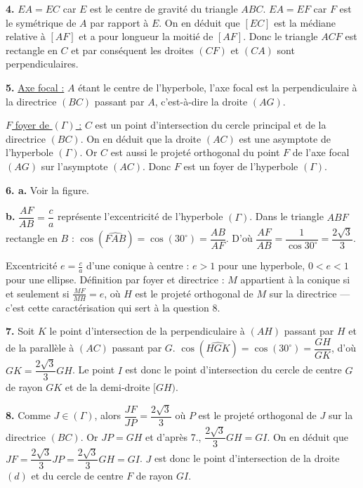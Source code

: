 \documentclass[11pt]{article}
\begin{document}
\textbf{4.} $EA = EC$ car $E$ est le centre de gravité du triangle $ABC$. $EA = EF$ car $F$ est le symétrique de $A$ par rapport à $E$. On en déduit que $[EC]$ est la médiane relative à $[AF]$ et a pour longueur la moitié de $[AF]$. Donc le triangle $ACF$ est rectangle en $C$ et par conséquent les droites $(CF)$ et $(CA)$ sont perpendiculaires.

\textbf{5.} \underline{Axe focal :} $A$ étant le centre de l'hyperbole, l'axe focal est la perpendiculaire à la directrice $(BC)$ passant par $A$, c'est-à-dire la droite $(AG)$.

\underline{$F$ foyer de $(\Gamma)$ :} $C$ est un point d'intersection du cercle principal et de la directrice $(BC)$. On en déduit que la droite $(AC)$ est une asymptote de l'hyperbole $(\Gamma)$. Or $C$ est aussi le projeté orthogonal du point $F$ de l'axe focal $(AG)$ sur l'asymptote $(AC)$. Donc $F$ est un foyer de l'hyperbole $(\Gamma)$.

\textbf{6. a.} Voir la figure.

\textbf{b.} $\dfrac{AF}{AB} = \dfrac{c}{a}$ représente l'excentricité de l'hyperbole $(\Gamma)$. Dans le triangle $ABF$ rectangle en $B$ : $\cos(\widehat{FAB}) = \cos(30^\circ) = \dfrac{AB}{AF}$. D'où $\dfrac{AF}{AB} = \dfrac{1}{\cos 30^\circ} = \dfrac{2\sqrt{3}}{3}$.

\begin{rappel}
Excentricité $e = \frac{c}{a}$ d'une conique à centre : $e > 1$ pour une
hyperbole, $0 < e < 1$ pour une ellipse. Définition par foyer et
directrice : $M$ appartient à la conique si et seulement si
$\frac{MF}{MH} = e$, où $H$ est le projeté orthogonal de $M$ sur la
directrice — c'est cette caractérisation qui sert à la question 8.
\end{rappel}

\textbf{7.} Soit $K$ le point d'intersection de la perpendiculaire à $(AH)$ passant par $H$ et de la parallèle à $(AC)$ passant par $G$. $\cos(\widehat{HGK}) = \cos(30^\circ) = \dfrac{GH}{GK}$, d'où $GK = \dfrac{2\sqrt{3}}{3}GH$. Le point $I$ est donc le point d'intersection du cercle de centre $G$ de rayon $GK$ et de la demi-droite $[GH)$.

\textbf{8.} Comme $J \in (\Gamma)$, alors $\dfrac{JF}{JP} = \dfrac{2\sqrt{3}}{3}$ où $P$ est le projeté orthogonal de $J$ sur la directrice $(BC)$. Or $JP = GH$ et d'après 7., $\dfrac{2\sqrt{3}}{3}GH = GI$. On en déduit que $JF = \dfrac{2\sqrt{3}}{3}JP = \dfrac{2\sqrt{3}}{3}GH = GI$. $J$ est donc le point d'intersection de la droite $(d)$ et du cercle de centre $F$ de rayon $GI$.
\end{document}

